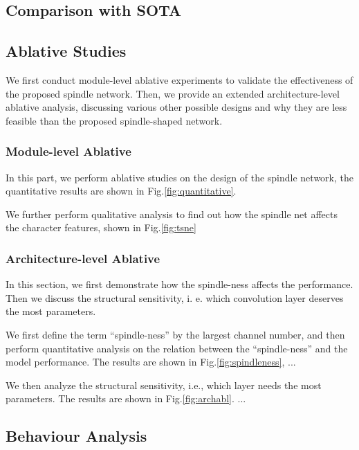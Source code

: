 \subsection{Comparison with SOTA}


\subsection{Ablative Studies}
We first conduct module-level ablative experiments to validate the effectiveness of the proposed spindle network. Then, we provide an extended architecture-level ablative analysis, discussing various other possible designs and why they are less feasible than the proposed spindle-shaped network.  

\subsubsection{Module-level Ablative}



In this part, we perform ablative studies on the design of the spindle network, the quantitative results are shown in Fig.\ref{fig:quantitative}.%


We further perform qualitative analysis to find out how the spindle net affects the character features, shown in Fig.\ref{fig:tsne}  



\subsubsection{Architecture-level Ablative}
In this section, we first demonstrate how the spindle-ness affects the performance. Then we discuss the structural sensitivity, i. e. which convolution layer deserves the most parameters.

We first define the term ``spindle-ness'' by the largest channel number, %
and then perform quantitative analysis on the relation between the ``spindle-ness'' and the model performance.
The results are shown in Fig.\ref{fig:spindleness}, ... %


We then analyze the structural sensitivity, i.e., which layer needs the most parameters. The results are shown in Fig.\ref{fig:archabl}. ... %

\subsection{Behaviour Analysis}


